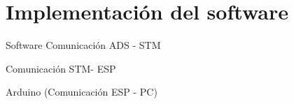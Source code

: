 \chapter{Implementación del software\label{sec:Implementacion_soft}}



Software
	Comunicación ADS - STM
	
	Comunicación STM- ESP
	
	Arduino (Comunicación ESP - PC)
	
	